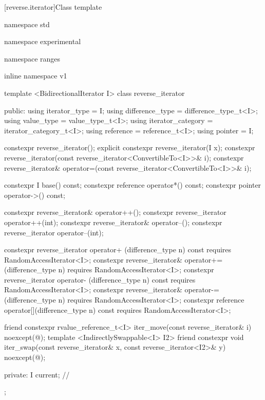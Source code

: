 [reverse.iterator]{Class template }

%
\begin{codeblock}
namespace std { namespace experimental { namespace ranges { inline namespace v1 {
  template <BidirectionalIterator I>
  class reverse_iterator {
  public:
    using iterator_type = I;
    using difference_type = difference_type_t<I>;
    using value_type = value_type_t<I>;
    using iterator_category = iterator_category_t<I>;
    using reference = reference_t<I>;
    using pointer = I;

    constexpr reverse_iterator();
    explicit constexpr reverse_iterator(I x);
    constexpr reverse_iterator(const reverse_iterator<ConvertibleTo<I>>& i);
    constexpr reverse_iterator& operator=(const reverse_iterator<ConvertibleTo<I>>& i);

    constexpr I base() const;
    constexpr reference operator*() const;
    constexpr pointer operator->() const;

    constexpr reverse_iterator& operator++();
    constexpr reverse_iterator  operator++(int);
    constexpr reverse_iterator& operator--();
    constexpr reverse_iterator  operator--(int);

    constexpr reverse_iterator  operator+ (difference_type n) const
      requires RandomAccessIterator<I>;
    constexpr reverse_iterator& operator+=(difference_type n)
      requires RandomAccessIterator<I>;
    constexpr reverse_iterator  operator- (difference_type n) const
      requires RandomAccessIterator<I>;
    constexpr reverse_iterator& operator-=(difference_type n)
      requires RandomAccessIterator<I>;
    constexpr reference operator[](difference_type n) const
      requires RandomAccessIterator<I>;

    friend constexpr rvalue_reference_t<I> iter_move(const reverse_iterator& i)
      noexcept(@\seebelow@);
    template <IndirectlySwappable<I> I2>
      friend constexpr void iter_swap(const reverse_iterator& x, const reverse_iterator<I2>& y)
        noexcept(@\seebelow@);

  private:
    I current; // \expos
  };

}}}}
\end{codeblock}

